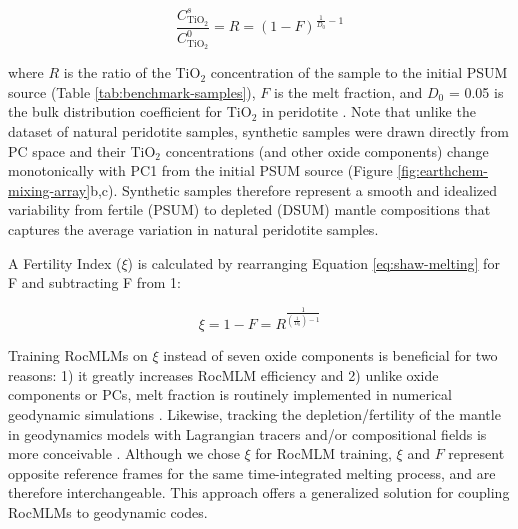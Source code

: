 \documentclass[draft,linenumbers]{agujournal2018}
\begin{document}
\begin{equation}
    \frac{C_{\text{TiO}_2}^s}{C_{\text{TiO}_2}^0} = R = (1 - F)^{\frac{1}{D_0} - 1}
    \label{eq:shaw-melting}
\end{equation}

\noindent where \(R\) is the ratio of the TiO\(_2\) concentration of the sample to the initial PSUM source (Table \ref{tab:benchmark-samples}), \(F\) is the melt fraction, and \(D_0\) = 0.05 is the bulk distribution coefficient for TiO\(_2\) in peridotite \citep[after][]{brown2016}. Note that unlike the dataset of natural peridotite samples, synthetic samples were drawn directly from PC space and their TiO\(_2\) concentrations (and other oxide components) change monotonically with PC1 from the initial PSUM source (Figure \ref{fig:earthchem-mixing-array}b,c). Synthetic samples therefore represent a smooth and idealized variability from fertile (PSUM) to depleted (DSUM) mantle compositions that captures the average variation in natural peridotite samples.

A Fertility Index (\(\xi\)) is calculated by rearranging Equation \eqref{eq:shaw-melting} for F and subtracting F from 1:

\begin{equation}
    \xi = 1 - F = R^{\frac{1}{(\frac{1}{D_0}) - 1}}
    \label{eq:melt-fraction}
\end{equation}

Training RocMLMs on \(\xi\) instead of seven oxide components is beneficial for two reasons: 1) it greatly increases RocMLM efficiency and 2) unlike oxide components or PCs, melt fraction is routinely implemented in numerical geodynamic simulations \citep[e.g.,][]{cerpa2019, gerya2003, kelley2010, li2019, sizova2010, yang2020}. Likewise, tracking the depletion/fertility of the mantle in geodynamics models with Lagrangian tracers and/or compositional fields is more conceivable \citep{tackley2003, cagnioncle2007, gerya2011, agrusta2015}. Although we chose \(\xi\) for RocMLM training, \(\xi\) and \(F\) represent opposite reference frames for the same time-integrated melting process, and are therefore interchangeable. This approach offers a generalized solution for coupling RocMLMs to geodynamic codes.
\end{document}
